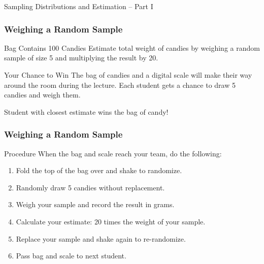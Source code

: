 \documentclass[handout]{beamer}
\date{Lecture \# 14}
\begin{document}
 


\begin{frame}[plain]
	\titlepage 
	

\end{frame} 




\begin{frame}
\begin{center}
\Huge Sampling Distributions and Estimation -- Part I
\end{center}
\end{frame}


\begin{frame}
\frametitle{Weighing a Random Sample}
\begin{block}{Bag Contains 100 Candies}
Estimate total weight of candies by weighing a random sample of size 5 and multiplying the result by 20.
\end{block}
\begin{block}{Your Chance to Win}
The bag of candies and a digital scale will make their way around the room \alert{during the lecture}. Each student gets a chance to draw 5 candies and weigh them.
\end{block}
\begin{alertblock}{Student with closest estimate wins the bag of candy!}
\end{alertblock}

\end{frame}
\begin{frame}
\frametitle{Weighing a Random Sample}
\begin{block}{Procedure}
When the bag and scale reach your team, do the following:
\end{block}
\begin{enumerate}
\item Fold the top of the bag over and shake to randomize.
\item Randomly draw 5 candies \alert{without replacement}.
\item Weigh your sample and record the result \alert{in grams}.
\item Calculate your \alert{estimate: 20 times the weight of your sample.}
\item Replace your sample and shake again to re-randomize.
\item Pass bag and scale to next student.
\end{enumerate}
\end{frame}
\end{document}
